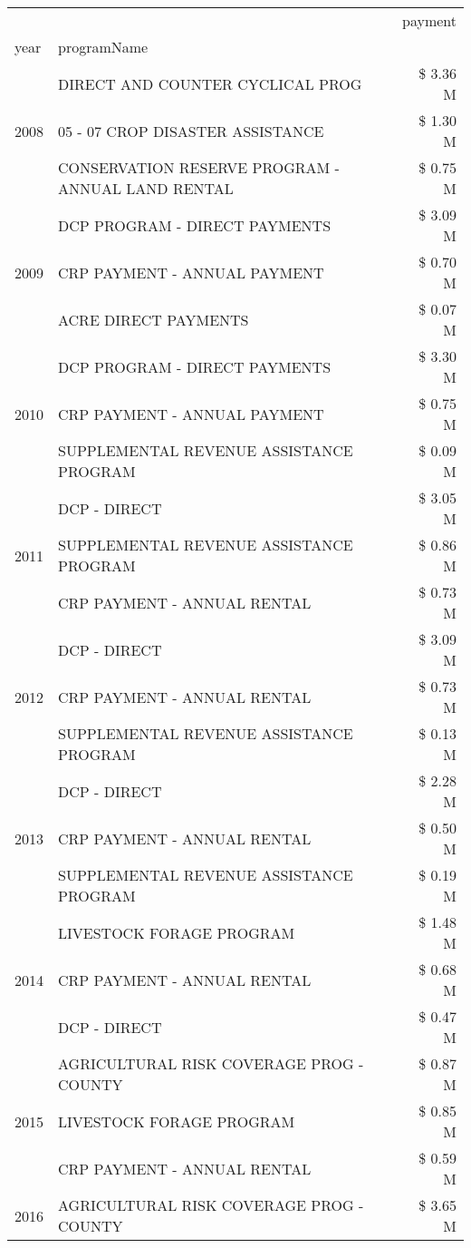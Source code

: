 \begin{tabular}{llr}
\toprule
 &  & payment \\
year & programName &  \\
\midrule
\multirow[t]{3}{*}{2008} & DIRECT AND COUNTER CYCLICAL PROG & \$ 3.36 M \\
 & 05 - 07 CROP DISASTER ASSISTANCE & \$ 1.30 M \\
 & CONSERVATION RESERVE PROGRAM - ANNUAL LAND RENTAL & \$ 0.75 M \\
\cline{1-3}
\multirow[t]{3}{*}{2009} & DCP PROGRAM - DIRECT PAYMENTS & \$ 3.09 M \\
 & CRP PAYMENT - ANNUAL PAYMENT & \$ 0.70 M \\
 & ACRE DIRECT PAYMENTS & \$ 0.07 M \\
\cline{1-3}
\multirow[t]{3}{*}{2010} & DCP PROGRAM - DIRECT PAYMENTS & \$ 3.30 M \\
 & CRP PAYMENT - ANNUAL PAYMENT & \$ 0.75 M \\
 & SUPPLEMENTAL REVENUE ASSISTANCE PROGRAM & \$ 0.09 M \\
\cline{1-3}
\multirow[t]{3}{*}{2011} & DCP - DIRECT & \$ 3.05 M \\
 & SUPPLEMENTAL REVENUE ASSISTANCE PROGRAM & \$ 0.86 M \\
 & CRP PAYMENT - ANNUAL RENTAL & \$ 0.73 M \\
\cline{1-3}
\multirow[t]{3}{*}{2012} & DCP - DIRECT & \$ 3.09 M \\
 & CRP PAYMENT - ANNUAL RENTAL & \$ 0.73 M \\
 & SUPPLEMENTAL REVENUE ASSISTANCE PROGRAM & \$ 0.13 M \\
\cline{1-3}
\multirow[t]{3}{*}{2013} & DCP - DIRECT & \$ 2.28 M \\
 & CRP PAYMENT - ANNUAL RENTAL & \$ 0.50 M \\
 & SUPPLEMENTAL REVENUE ASSISTANCE PROGRAM & \$ 0.19 M \\
\cline{1-3}
\multirow[t]{3}{*}{2014} & LIVESTOCK FORAGE PROGRAM & \$ 1.48 M \\
 & CRP PAYMENT - ANNUAL RENTAL & \$ 0.68 M \\
 & DCP - DIRECT & \$ 0.47 M \\
\cline{1-3}
\multirow[t]{3}{*}{2015} & AGRICULTURAL RISK COVERAGE PROG - COUNTY & \$ 0.87 M \\
 & LIVESTOCK FORAGE PROGRAM & \$ 0.85 M \\
 & CRP PAYMENT - ANNUAL RENTAL & \$ 0.59 M \\
\cline{1-3}
\multirow[t]{3}{*}{2016} & AGRICULTURAL RISK COVERAGE PROG - COUNTY      & \$ 3.65 M \\

\end{tabular}
